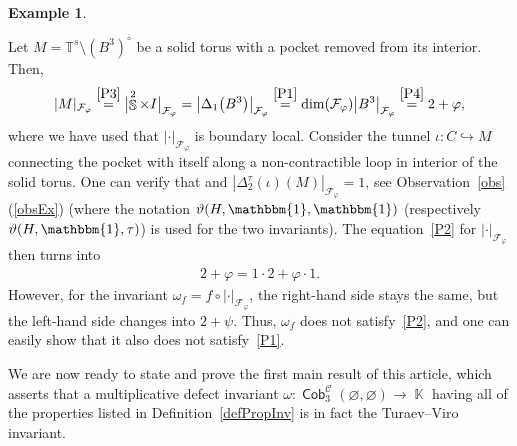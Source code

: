 \documentclass[10pt,a4paper]{amsart}
\DeclareMathOperator{\K}{\mathbb{K}}
\DeclareMathOperator{\Sp}{\mathbb{S}}
\DeclareMathOperator{\Cob}{\mathsf{Cob}}
\DeclareMathOperator{\calc}{\mathcal{C}}
\numberwithin{equation}{section}
\theoremstyle{definition}
\newtheorem{Example}[Example]{Example}
\begin{document}
\begin{Example}
\begin{enumerate}[(i)]
 Let $M = \mathbb{T}^s \setminus (B^3)^{\circ}$ be a solid torus with a pocket removed from its interior. Then,
 \begin{align*}
 |M|_{\mathcal{F}_{\varphi}} \overset{\rm \ref{P3}}{=} \bigl|{\Sp^2 \times I}\bigr|_{\mathcal{F}_{\varphi}} = \bigl|\Delta_1\bigl(B^3\bigr)\bigr|_{\mathcal{F}_{\varphi}} \overset{\rm \ref{P1}}{=} \dim(\mathcal{F}_{\varphi})\bigl|B^3\bigr|_{\mathcal{F}_{\varphi}} \overset{\rm \ref{P4}}{=} 2+\varphi,
 \end{align*}
 where we have used that $|\cdot|_{\mathcal{F}_{\varphi}}$ is boundary local. Consider the tunnel $\iota\colon C \hookrightarrow M$ connecting the pocket with itself along a non-contractible loop in interior of the solid torus. One can verify that  and $|\Delta_2^{\tau}(\iota)(M)|_{\mathcal{F}_{\varphi}} = 1$, see Observation~\ref{obs}\,(\ref{obsEx}) (where the notation $\vartheta(H, \mathbbm{1},\mathbbm{1})$ (respectively $\vartheta(H, \mathbbm{1},\tau)$) is used for the two invariants). The equation~\ref{P2} for $|\cdot|_{\mathcal{F}_{\varphi}}$ then turns into
 \begin{align*}
 2+\varphi = 1\cdot 2 + \varphi \cdot 1.
 \end{align*}
 However, for the invariant $\omega_f = f \circ |\cdot|_{\mathcal{F}_{\varphi}}$, the right-hand side stays the same, but the left-hand side changes into $2 + \psi$. Thus, $\omega_f$ does not satisfy~\ref{P2}, and one can easily show that it also does not satisfy~\ref{P1}.
 \end{enumerate}
\end{Example}

We are now ready to state and prove the first main result of this article, which asserts that a multiplicative defect invariant $\omega \colon \Cob_3^{\calc}(\varnothing, \varnothing) \rightarrow \K$ having all of the properties listed in Definition~\ref{defPropInv} is in fact the Turaev--Viro invariant.
\end{document}
